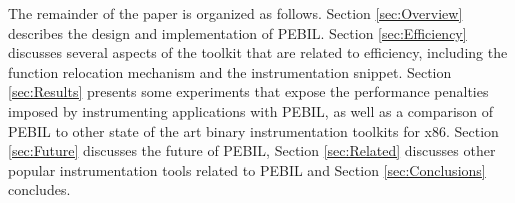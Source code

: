 The remainder of the paper is organized as follows. Section \ref{sec:Overview}
describes the design and implementation of PEBIL. Section \ref{sec:Efficiency}
discusses several aspects of the toolkit that are related to efficiency,
including the function relocation mechanism and the instrumentation snippet.
Section \ref{sec:Results} presents some experiments that expose the performance
penalties imposed by instrumenting applications with PEBIL, as well as a
comparison of PEBIL to other state of the art binary instrumentation toolkits
for x86. Section \ref{sec:Future}
discusses the future of PEBIL, Section \ref{sec:Related} discusses other popular
instrumentation tools related to PEBIL and Section \ref{sec:Conclusions}
concludes.
